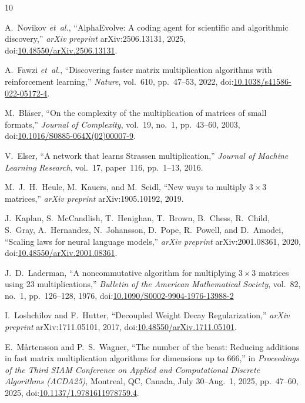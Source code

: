 \documentclass[11pt]{article}
\begin{document}

\begin{thebibliography}{10}

A.~Novikov \emph{et~al.}, ``AlphaEvolve: A coding agent for scientific and
  algorithmic discovery,'' \emph{arXiv preprint} arXiv:2506.13131, 2025,
  doi:\href{https://doi.org/10.48550/arXiv.2506.13131}{10.48550/arXiv.2506.13131}.
  
A.~Fawzi \emph{et~al.}, ``Discovering faster matrix multiplication algorithms
  with reinforcement learning,'' \emph{Nature}, vol.~610, pp.~47--53, 2022,
  doi:\href{https://doi.org/10.1038/s41586-022-05172-4}{10.1038/s41586-022-05172-4}.

M.~Bläser, ``On the complexity of the multiplication of matrices of small
  formats,'' \emph{Journal of Complexity}, vol.~19, no.~1, pp.~43--60, 2003,
  doi:\href{https://doi.org/10.1016/S0885-064X(02)00007-9}{10.1016/S0885-064X(02)00007-9}.

V.~Elser, ``A network that learns Strassen multiplication,'' 
  \emph{Journal of Machine Learning Research}, vol.~17, paper~116, pp.~1--13, 2016.

M.~J.~H.~Heule, M.~Kauers, and M.~Seidl, ``New ways to multiply $3\times3$
  matrices,'' \emph{arXiv preprint} arXiv:1905.10192, 2019.

J.~Kaplan, S.~McCandlish, T.~Henighan, T.~Brown, B.~Chess, R.~Child,
S.~Gray, A.~Hernandez, N.~Johansson, D.~Pope, R.~Powell, and
D.~Amodei,
``Scaling laws for neural language models,''
\emph{arXiv preprint} arXiv:2001.08361, 2020,
doi:\href{https://doi.org/10.48550/arXiv.2001.08361}{10.48550/arXiv.2001.08361}.

J.~D.~Laderman, ``A noncommutative algorithm for multiplying 
  $3\times3$ matrices using 23 multiplications,'' 
  \emph{Bulletin of the American Mathematical Society}, vol.~82, no.~1,
  pp.~126--128, 1976, doi:\href{https://doi.org/10.1090/S0002-9904-1976-13988-2}{10.1090/S0002-9904-1976-13988-2}

I.~Loshchilov and F.~Hutter, ``Decoupled Weight Decay Regularization,''
  \emph{arXiv preprint} arXiv:1711.05101, 2017,
  doi:\href{https://doi.org/10.48550/arXiv.1711.05101}{10.48550/arXiv.1711.05101}.
  
E.~M\aa rtensson and P.~S.~Wagner, ``The number of the beast: Reducing additions in fast matrix multiplication algorithms for dimensions up to 666,'' in \emph{Proceedings of the Third SIAM Conference on Applied and Computational Discrete Algorithms (ACDA25)}, Montreal, QC, Canada, July 30–Aug.~1, 2025, pp.~47--60, 2025,
doi:\href{https://doi.org/10.1137/1.9781611978759.4}{10.1137/1.9781611978759.4}.


\end{thebibliography}
\end{document}
